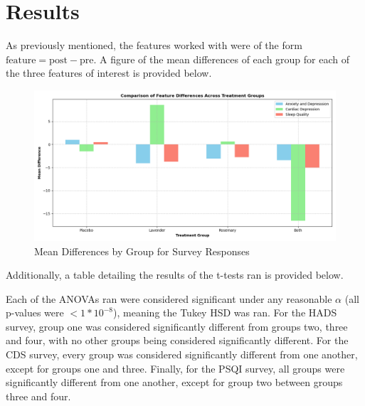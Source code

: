 \documentclass{article}
\begin{document}
\section{Results}
As previously mentioned, the features worked with were of the form $\text{feature}=\text{post}-\text{pre}$.
 A figure of the mean differences of each group for each of the three features
 of interest is provided below. \\
\begin{figure}[H]
    \centering
    \includegraphics[width=\textwidth]{../figures/mean_feature_diffs.png}
    \caption{Mean Differences by Group for Survey Responses}
    \label{fig:mean_feat_diffs}
\end{figure}
Additionally, a table detailing the results of the t-tests ran is provided below.
\begin{table}[H]
\caption{One-sample t-tests for HADS\_diff, CDS\_diff, and PSQI\_diff (horizontal format)}
\end{table}

Each of the ANOVAs ran were considered significant under any reasonable $\alpha$
(all p-values were $<1*10^{-8}$),
meaning the Tukey HSD was ran. For the HADS survey, group one was considered
significantly different from groups two, three and four, with no other groups
being considered significantly different.  For the CDS survey, every group
was considered significantly different from one another, except for groups
one and three. Finally, for the PSQI survey, all groups were significantly different from
one another, except for group two between groups three and four.
\newpage
\end{document}
